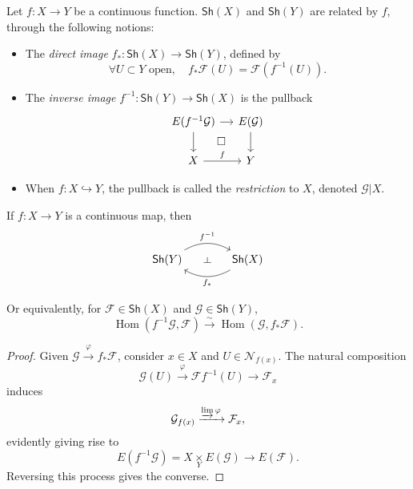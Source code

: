\begin{definition}
    Let $f:X\to Y$ be a continuous function. $\mathsf{Sh}(X)$ and $\mathsf{Sh}(Y)$ are related by $f$, through the following notions:
    \begin{itemize}
        \item The \emph{direct image} $f_*:\mathsf{Sh}(X)\to\mathsf{Sh}(Y)$, defined by
        $$\forall U\subset Y\text{ open},\quad f_*\mathcal{F}(U)=\mathcal{F}(f^{-1}(U)).$$
        
        \item The \emph{inverse image} $f^{-1}:\mathsf{Sh}(Y)\to\mathsf{Sh}(X)$ is the pullback
        \[ \begin{tikzcd}[column sep=small]
            E(f^{-1}\mathcal{G}) \arrow[r] \arrow[d] \arrow[rd, "\Box" description, phantom, pos=0.4] & E(\mathcal{G}) \arrow[d] \\
            X \arrow[r, "f"] & Y 
        \end{tikzcd} \]

        \item When $f:X\hookrightarrow Y$, the pullback is called the \emph{restriction} to $X$, denoted $\mathcal{G}|X$.
    \end{itemize}
\end{definition}

\begin{theorem}
    If $f:X\to Y$ is a continuous map, then
    \[ \begin{tikzcd}[column sep=large]
        \mathsf{Sh}(Y) \arrow[r, bend left, "f^{-1}"{name=U}] & \mathsf{Sh}(X) \arrow[l, bend left, "f_*"{name=D}] \arrow[phantom, from=U, to=D, sloped, "\dashv"]
    \end{tikzcd} \]
    
    Or equivalently, for $\mathcal{F}\in\mathsf{Sh}(X)$ and $\mathcal{G}\in\mathsf{Sh}(Y)$,
    $$\operatorname{Hom}(f^{-1}\mathcal{G},\mathcal{F})\xrightarrow{\sim}\operatorname{Hom}(\mathcal{G},f_*\mathcal{F}).$$
\end{theorem}

\begin{proof}
    Given $\mathcal{G}\xrightarrow{\varphi} f_*\mathcal{F}$, consider $x\in X$ and $U\in\mathcal{N}_{f(x)}$. The natural composition
    $$\mathcal{G}(U)\xrightarrow{\varphi}\mathcal{F}f^{-1}(U)\to\mathcal{F}_x$$
    induces
    $$\mathcal{G}_{f(x)}\xrightarrow{\varinjlim\varphi}\mathcal{F}_x,$$
    evidently giving rise to
    $$E(f^{-1}\mathcal{G})=X\underset{Y}{\times}E(\mathcal{G})\longrightarrow E(\mathcal{F}).$$
    Reversing this process gives the converse.    
\end{proof}

\begin{proposition}
    
\end{proposition}